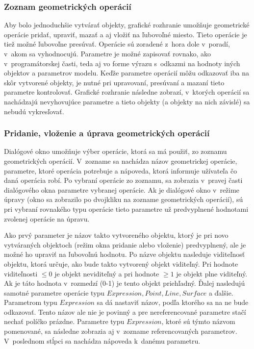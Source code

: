  
\subsubsection*{Zoznam geometrických operácií}
Aby bolo jednoduchšie vytvárať objekty, grafické rozhranie umožňuje geometrické operácie pridať, upraviť, mazať a aj vložiť na ľubovoľné miesto. Tieto operácie je tiež možné ľubovoľne presúvať. Operácie sú zoradené z~hora dole v~poradí, v~akom sa vyhodnocujú. Parametre je možné zapisovať rovnako, ako v~programátorskej časti, teda aj vo forme výrazu s~odkazmi na hodnoty iných objektov a parametrov modelu. Keďže parametre operácií môžu odkazovať iba na skôr vytvorené objekty, je nutné pri upravovaní, presúvaní a mazaní tieto parametre kontrolovať. Grafické rozhranie následne zobrazí, v~ktorých operácií sa nachádzajú nevyhovujúce parametre a tieto objekty (a objekty na nich závislé) sa nebudú vykresľovať.



\subsubsection{Pridanie, vloženie a úprava geometrických operácií} 
Dialógové okno umožňuje výber operácie,  ktorá sa má použiť, zo zoznamu geometrických operácií. V~zozname sa nachádza názov geometrickej operácie, parametre, ktoré operácia potrebuje a nápoveda, ktorá informuje užívateľa čo daná operácia robí.
Po vybraní operácie zo zoznamu, sa zobrazia v~pravej časti dialógového okna parametre vybranej operácie. Ak je dialógové okno v~režime úpravy (okno sa zobrazilo po dvojkliku na zozname geometrických operácií), sú pri vybraní rovnakého typu operácie tieto parametre už predvyplnené hodnotami zvolenej operácie na úpravu.

Ako prvý parameter je názov takto vytvoreného objektu, ktorý je pri novo vytváraných objektoch (režim okna pridanie alebo vloženie) predvyplnený, ale je možné ho upraviť na ľubovoľnú hodnotu.  
Po názve objektu nasleduje viditeľnosť objektu, ktorá určuje, ako bude takto vytvorený objekt viditeľný. Pri hodnote viditeľnosti $\leq0$ je objekt neviditeľný a pri hodnote $\geq1$ je objekt plne viditeľný. Ak je táto hodnota v~rozmedzí (0-1) je tento objekt priehľadný. 
Ďalej nasledujú samotné parametre operácie typu $Expression,  Point, Line, Surface$ a ďalšie. Parametrom typu $Expression$ sa dá nastaviť názov, podľa ktorého sa na ne bude odkazovať. Tento názov ale nie je povinný a pre nereferencované parametre stačí nechať políčko prázdne. Parametre typu $Expression$, ktoré sú týmto názvom pomenované, sa následne zobrazia aj v~zozname referencovaných parametrov.
V~poslednom stĺpci sa nachádza nápoveda k~danému parametru.

